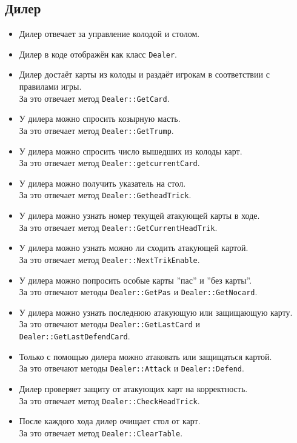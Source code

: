 \documentclass[a4paper,12pt]{article}
\begin{document}
        \subsection{Дилер}
            \begin{itemize}
                \item[] Дилер отвечает за управление колодой и столом.
                \item[] Дилер в коде отображён как класс \texttt{Dealer}.
                \item[] Дилер достаёт карты из колоды и раздаёт игрокам в соответствии с правилами игры.\\
                        За это отвечает метод \texttt{Dealer::GetCard}.
                \item[] У дилера можно спросить козырную масть.\\
                        За это отвечает метод \texttt{Dealer::GetTrump}.
                \item[] У дилера можно спросить число вышедших из колоды карт.\\
                        За это отвечает метод \texttt{Dealer::getcurrentCard}.
                \item[] У дилера можно получить указатель на стол.\\
                        За это отвечает метод \texttt{Dealer::GetheadTrick}.
                \item[] У дилера можно узнать номер текущей атакующей карты в ходе.\\
                        За это отвечает метод \texttt{Dealer::GetCurrentHeadTrik}.
                \item[] У дилера можно узнать можно ли сходить атакующей картой.\\
                        За это отвечает метод \texttt{Dealer::NextTrikEnable}.
                \item[] У дилера можно попросить особые карты ''пас'' и ''без карты''.\\
                        За это отвечают методы \texttt{Dealer::GetPas} и \texttt{Dealer::GetNocard}.
                \item[] У дилера можно узнать последнюю атакующую или защищающую карту.\\
                        За это отвечают методы \texttt{Dealer::GetLastCard} и \texttt{Dealer::GetLastDefendCard}.
                \item[] Только с помощью дилера можно атаковать или защищаться картой.\\
                        За это отвечают методы \texttt{Dealer::Attack} и \texttt{Dealer::Defend}.
                \item[] Дилер проверяет защиту от атакующих карт на корректность.\\
                        За это отвечает метод \texttt{Dealer::CheckHeadTrick}.
                \item[] После каждого хода дилер очищает стол от карт.\\
                        За это отвечает метод \texttt{Dealer::ClearTable}.
            \end{itemize}
            
\end{document}
